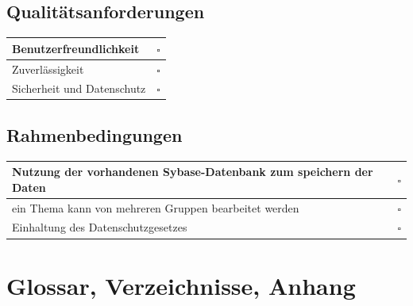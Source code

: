 \documentclass{article}
\begin{document}
\subsection{Qualitätsanforderungen}
\begin{tabular}{p{17cm} c}
	Benutzerfreundlichkeit		&	$\square$	\\
\hline
	Zuverlässigkeit				&	$\square$	\\
\hline
	Sicherheit und Datenschutz	&	$\square$	\\
\end{tabular}

\subsection{Rahmenbedingungen}
\begin{tabular}{p{17cm} c}
	Nutzung der vorhandenen Sybase-Datenbank zum speichern der Daten	&	$\square$	\\
\hline
	ein Thema kann von mehreren Gruppen bearbeitet werden				&	$\square$	\\
\hline
	Einhaltung des Datenschutzgesetzes									&	$\square$	\\
\end{tabular}
\newpage

\section{Glossar, Verzeichnisse, Anhang}
\end{document}
